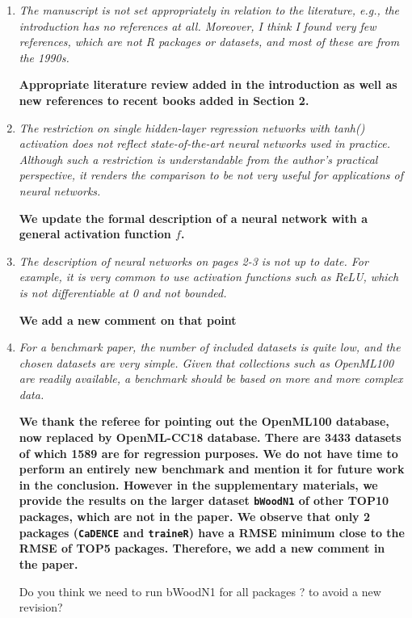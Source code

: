 \documentclass[12pt]{article}
\newcommand{\code}{\texttt}
\newcommand{\red}[1]{{\color{red}#1}}
\begin{document}
\begin{enumerate}
\item \textit{The manuscript is not set appropriately in relation to the literature, e.g., the introduction has no references at all. Moreover, I think I found very few references, which are not R packages or datasets, and most of these are from the 1990s.}

\textbf{Appropriate literature review added in the introduction as well 
as new references to recent books added in Section 2.
}


\item \textit{The restriction on single hidden-layer regression networks with tanh() activation does not reflect state-of-the-art neural networks used in practice. Although such a restriction is understandable from the author’s practical perspective, it renders the comparison to be not very useful for applications of neural networks.}

\textbf{We update the formal description of a neural network with a general activation function $f$.}

\item \textit{The description of neural networks on pages 2-3 is not up to date. For example, it is very common to use activation functions such as ReLU, which is not differentiable at 0 and not bounded.}

\textbf{We add a new comment on that point}


\item \textit{For a benchmark paper, the number of included datasets is quite low, and the chosen datasets are very simple. Given that collections such as OpenML100 are readily available, a benchmark should be based on more and more complex data.}

\textbf{We thank the referee for pointing out the OpenML100 database, now replaced by OpenML-CC18 database. 
There are 3433 datasets of which 1589 are for regression purposes.
We do not have time to perform an entirely new benchmark and mention it for future work in the conclusion.
However in the supplementary materials, we provide the results on the larger dataset 
\code{bWoodN1} of other TOP10 packages, which are not in the paper.
We observe that only 2 packages (\code{CaDENCE} and \code{traineR}) 
have a RMSE minimum close to the RMSE of TOP5 packages.
Therefore, we add a new comment in the paper.}



\red{Do you think we need to run bWoodN1 for all packages ? to avoid a new revision?}


\end{enumerate}
\end{document}
